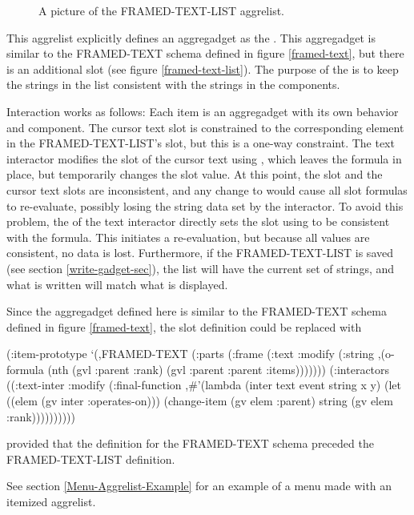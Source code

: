 \begin{figure}
\begin{center}
\end{center}
\caption{A picture of the FRAMED-TEXT-LIST aggrelist.}
\end{figure}

This
aggrelist explicitly defines an aggregadget as the .
This aggregadget is similar to the FRAMED-TEXT schema defined
in figure \ref{framed-text}, but there is an additional 
slot (see figure \ref{framed-text-list}).  The purpose of the
 is to keep the strings in the
 list consistent with the strings in the components.

Interaction works as follows:  Each item is an aggregadget with
its own  behavior and  component.
The cursor text  slot is constrained to the corresponding
element in the FRAMED-TEXT-LIST's  slot, but this
is a one-way constraint.
The text interactor modifies the  slot of the
cursor text using , which leaves the formula in place,
but temporarily changes the slot value.  At this point, the 
slot and the cursor text  slots are inconsistent, and
any change to  would cause all  slot formulas
to re-evaluate, possibly losing the string data set by the interactor.
To avoid this problem, the  of the
text interactor directly sets the 
slot using  to be consistent with the formula.  This
initiates a re-evaluation, but because all values are consistent,
no data is lost.  Furthermore, if the FRAMED-TEXT-LIST is saved
(see section \ref{write-gadget-sec}), the  list will have
the current set of strings, and what is written will match what is
displayed.

\begin{group}
Since the aggregadget defined here is similar to the
FRAMED-TEXT schema defined in figure \ref{framed-text}, the
 slot definition could be replaced with
\begin{programexample}
(:item-prototype
 `(,FRAMED-TEXT
   (:parts
    (:frame
     (:text :modify
	(:string ,(o-formula (nth (gvl :parent :rank)
				  (gvl :parent :parent :items)))))))
   (:interactors
    ((:text-inter :modify
		  (:final-function
		   ,\#'(lambda (inter text event string x y)
			(let ((elem (gv inter :operates-on)))
			  (change-item (gv elem :parent)
				       string
				       (gv elem :rank))))))))))
\end{programexample}
provided that the definition for the FRAMED-TEXT schema preceded the
FRAMED-TEXT-LIST definition.

See section \ref{Menu-Aggrelist-Example} for an example of a menu
made with an itemized aggrelist.
\end{group}


